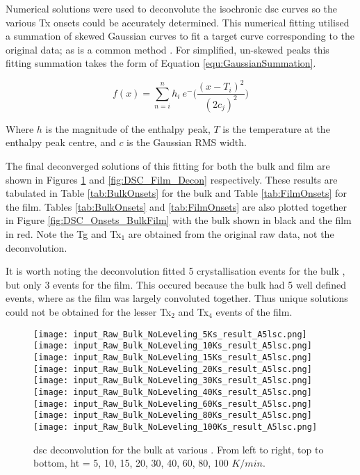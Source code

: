 \documentclass[a4paper,12pt,oneside]{article}%
\begin{document}
Numerical 
solutions were used to deconvolute the isochronic \acrshort{dsc} curves so the various \gls{Tx} onsets could be accurately determined. This numerical fitting utilised a summation of skewed Gaussian curves to fit a target curve corresponding to the original data; as is a common method \cite{Ashour2010, Yamamoto2007, Spink2008, Spink2015, Schaffer2005}. For simplified, un-skewed peaks this fitting summation takes the form of Equation \ref{equ:GaussianSummation}.

\begin{equation}
	f(x) = \sum_{n=i}^{n} h_{i}~ e^-{\bigg(\frac{(x-T_{i})^2}{(2c_{j})^2}\bigg)}
	\label{equ:GaussianSummation}
\end{equation}

Where $h$ is the magnitude of the enthalpy peak, $T$ is the temperature at the enthalpy peak centre, and $c$ is the Gaussian RMS width.

The final deconverged solutions of this fitting for both the bulk and film are shown in Figures \ref{fig:DSC_Bulk_Decon} and \ref{fig:DSC_Film_Decon} respectively. These results are tabulated in Table \ref{tab:BulkOnsets} for the bulk and Table \ref{tab:FilmOnsets} for the film. Tables \ref{tab:BulkOnsets} and \ref{tab:FilmOnsets} are also plotted together in Figure \ref{fig:DSC_Onsets_BulkFilm} with the bulk shown in black and the film in red. Note the \gls{Tg} and \gls{Tx}$_{1}$ are obtained from the original raw data, not the deconvolution.

It is worth noting the deconvolution fitted 5 crystallisation events for the bulk \MgZnCa, but only 3 events for the film. This occured because the bulk had 5 well defined events, where as the film was largely convoluted together. Thus unique solutions could not be obtained for the lesser \gls{Tx}$_{2}$ and \gls{Tx}$_{4}$ events of the film. 

\begin{figure}[b]
	\centering
	\texttt{[image: input\_Raw\_Bulk\_NoLeveling\_5Ks\_result\_A5lsc.png]}\quad
	\texttt{[image: input\_Raw\_Bulk\_NoLeveling\_10Ks\_result\_A5lsc.png]}\quad
	\texttt{[image: input\_Raw\_Bulk\_NoLeveling\_15Ks\_result\_A5lsc.png]}
	\medskip
	\texttt{[image: input\_Raw\_Bulk\_NoLeveling\_20Ks\_result\_A5lsc.png]}\quad
	\texttt{[image: input\_Raw\_Bulk\_NoLeveling\_30Ks\_result\_A5lsc.png]}\quad
	\texttt{[image: input\_Raw\_Bulk\_NoLeveling\_40Ks\_result\_A5lsc.png]}
	\medskip
	\texttt{[image: input\_Raw\_Bulk\_NoLeveling\_60Ks\_result\_A5lsc.png]}\quad
	\texttt{[image: input\_Raw\_Bulk\_NoLeveling\_80Ks\_result\_A5lsc.png]}\quad
	\texttt{[image: input\_Raw\_Bulk\_NoLeveling\_100Ks\_result\_A5lsc.png]}
	\caption{\acrshort{dsc} deconvolution for the bulk at various . From left to right, top to bottom, \gls{ht} = 5, 10, 15, 20, 30, 40, 60, 80, 100 $K/min$.}
	\label{fig:DSC_Bulk_Decon}
\end{figure}
\end{document}
